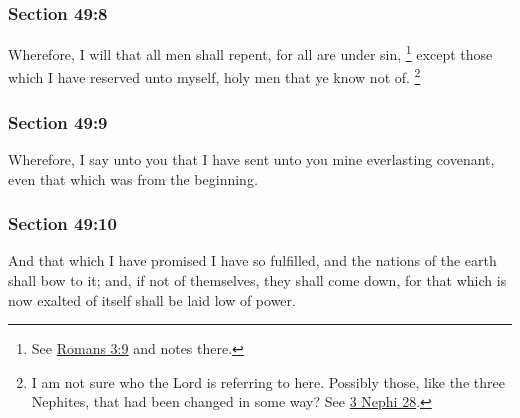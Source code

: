	\subsubsection{Section 49:8} %
		\label{DC49-8}

		Wherefore, I will that all men shall repent, for all are under sin,%
			\footnote{%
				See \hyperref[ROMANS-3-9]{Romans 3:9} and notes there.
				}
		except those which I have reserved unto myself, holy men that ye know not of.%
			\footnote{%
				I am not sure who the Lord is referring to here. Possibly those, like the three Nephites, that had been changed in some way? See \hyperref[3NEPHI-28]{3 Nephi 28}.
				}


	\subsubsection{Section 49:9} %
		\label{DC49-9}

		Wherefore, I say unto you that I have sent unto you mine everlasting covenant, even that which was from the beginning.


	\subsubsection{Section 49:10} %
		\label{DC49-10}

		And that which I have promised I have so fulfilled, and the nations of the earth shall bow to it; and, if not of themselves, they shall come down, for that which is now exalted of itself shall be laid low of power.

